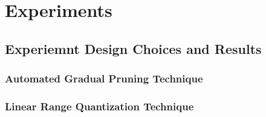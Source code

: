 
\section{Experiments}
    \subsection{Experiemnt Design Choices and Results}

        \subsubsection{Automated Gradual Pruning Technique}
        
        
        
        
        

        \subsubsection{Linear Range Quantization Technique}
        
        
        
